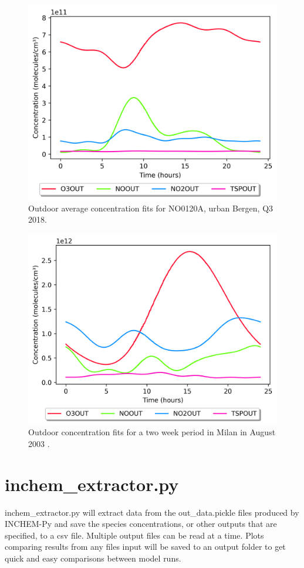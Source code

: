 \documentclass[a4paper]{refart}
\begin{document}
\begin{figure}[h!]
    \centering
    \includegraphics[width=\textwidth]{Bergen_urban.png}
    \caption{Outdoor average concentration fits for NO0120A, urban Bergen, Q3 2018.}
    \label{fig:Out_berg_urb}
\end{figure}
\begin{figure}[h!]
    \centering
    \includegraphics[width=\textwidth]{Milan_Aug2003.png}
    \caption{Outdoor concentration fits for a two week period in Milan in August 2003 \cite{Terry2014}.}
    \label{fig:Milan}
\end{figure}

\clearpage
\section{inchem\_extractor.py}\label{inchem_extractor.py}
inchem\_extractor.py will extract data from the out\_data.pickle files produced by INCHEM-Py and save the species concentrations, or other outputs that are specified, to a csv file. Multiple output files can be read at a time. Plots comparing results from any files input will be saved to an output folder to get quick and easy comparisons between model runs. 
\end{document}
